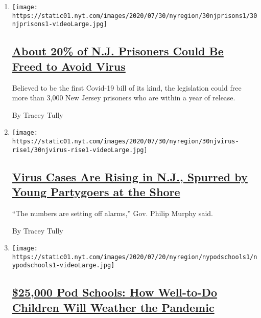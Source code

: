 \begin{enumerate}
\def\labelenumi{\arabic{enumi}.}
\item
  \texttt{[image: https://static01.nyt.com/images/2020/07/30/nyregion/30njprisons1/30njprisons1-videoLarge.jpg]}

  \hypertarget{about-20-of-nj-prisoners-could-be-freed-to-avoid-virus}{%
  \subsection{\texorpdfstring{\href{/2020/07/30/nyregion/New-jersey-inmate-release-Covid.html}{About
  20\% of N.J. Prisoners Could Be Freed to Avoid
  Virus}}{About 20\% of N.J. Prisoners Could Be Freed to Avoid Virus}}\label{about-20-of-nj-prisoners-could-be-freed-to-avoid-virus}}

  Believed to be the first Covid-19 bill of its kind, the legislation
  could free more than 3,000 New Jersey prisoners who are within a year
  of release.

  By Tracey Tully
\item
  \texttt{[image: https://static01.nyt.com/images/2020/07/30/nyregion/30njvirus-rise1/30njvirus-rise1-videoLarge.jpg]}

  \hypertarget{virus-cases-are-rising-in-nj-spurred-by-young-partygoers-at-the-shore}{%
  \subsection{\texorpdfstring{\href{/2020/07/30/nyregion/coronavirus-cases-nj.html}{Virus
  Cases Are Rising in N.J., Spurred by Young Partygoers at the
  Shore}}{Virus Cases Are Rising in N.J., Spurred by Young Partygoers at the Shore}}\label{virus-cases-are-rising-in-nj-spurred-by-young-partygoers-at-the-shore}}

  ``The numbers are setting off alarms,'' Gov. Philip Murphy said.

  By Tracey Tully
\item
  \texttt{[image: https://static01.nyt.com/images/2020/07/20/nyregion/nypodschools1/nypodschools1-videoLarge.jpg]}

  \hypertarget{25000-pod-schools-how-well-to-do-children-will-weather-the-pandemic}{%
  \subsection{\texorpdfstring{\href{/2020/07/30/nyregion/pod-schools-hastings-on-hudson.html}{\$25,000
  Pod Schools: How Well-to-Do Children Will Weather the
  Pandemic}}{\$25,000 Pod Schools: How Well-to-Do Children Will Weather the Pandemic}}\label{25000-pod-schools-how-well-to-do-children-will-weather-the-pandemic}}


\end{enumerate}
